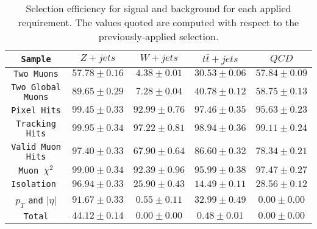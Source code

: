 \documentclass{cmspaper}
\begin{document}
\begin{table}[htdp]
  \caption{Selection efficiency for signal and background for each
    applied requirement. The values quoted are computed with respect
    to the previously-applied selection.}
 \centering
 \begin{tabular}{|c|c|c|c|c|}
   \hline
   \verb|Sample| & $Z+jets$ & $W+jets$ & $t \bar t+jets$ & $QCD$ \\
   \hline
   \verb|Two Muons|          & $ 57.78 \pm 0.16 $ & $ 4.38 \pm 0.01 $ & $ 30.53 \pm 0.06 $ & $ 57.84 \pm 0.09 $ \\
   \verb|Two Global Muons|   & $ 89.65 \pm 0.29 $ & $ 7.28 \pm 0.04 $ & $ 40.78 \pm 0.12 $ & $ 58.75 \pm 0.13 $ \\
   \verb|Pixel Hits|         & $ 99.45 \pm 0.33 $ & $ 92.99 \pm 0.76 $ & $ 97.46 \pm 0.35 $ & $ 95.63 \pm 0.23 $ \\
   \verb|Tracking Hits|      & $ 99.95 \pm 0.34 $ & $ 97.22 \pm 0.81$ & $ 98.94 \pm 0.36 $ & $ 99.11 \pm 0.24 $ \\
   \verb|Valid Muon Hits|    & $ 97.40 \pm 0.33 $ & $ 67.90 \pm 0.64 $ & $ 86.60 \pm 0.32 $ & $ 78.34 \pm 0.21 $ \\
   \verb|Muon |$\chi^2$      & $ 99.00 \pm 0.34 $ & $ 92.39 \pm 0.96 $ & $ 95.99 \pm 0.38 $ & $ 97.47 \pm 0.27 $ \\
   \verb|Isolation |         & $ 96.94 \pm 0.33 $ & $ 25.90 \pm 0.43$ & $ 14.49 \pm 0.11 $ & $ 28.56 \pm 0.12 $ \\
   $p_T$ \verb|and| $|\eta|$ & $ 91.67 \pm 0.33 $ & $ 0.55 \pm 0.11 $ & $ 32.99 \pm 0.49 $ & $ 0.00 \pm 0.00 $ \\
   \hline
   \verb|Total|              & $ 44.12 \pm 0.14 $ & $ 0.00 \pm 0.00 $ & $ 0.48 \pm 0.01 $ & $ 0.00 \pm 0.00 $ \\
   \hline
   \end{tabular}
\label{Table_MCSelectionEfficiencies}
\end{table}
\end{document}
